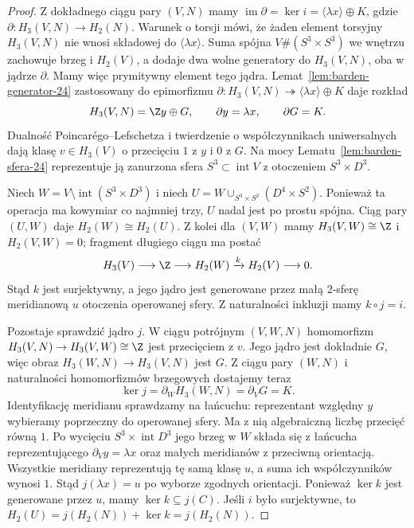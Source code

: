 \begin{proof}
Z dokładnego ciągu pary $(V,N)$ mamy
$\operatorname{im}\partial=\ker i
=\langle\lambda x\rangle\oplus K$,
gdzie $\partial\colon H_3(V,N)\to H_2(N)$.
Warunek o torsji mówi, że żaden element
torsyjny $H_3(V,N)$ nie wnosi składowej
do $\langle\lambda x\rangle$.
Suma spójna $V\#(S^3\times S^3)$
we wnętrzu zachowuje brzeg i $H_2(V)$,
a dodaje dwa wolne generatory do
$H_3(V,N)$, oba w jądrze $\partial$.
Mamy więc prymitywny element tego jądra.
Lemat~\ref{lem:barden-generator-24}
zastosowany do epimorfizmu
$\partial\colon H_3(V,N)\twoheadrightarrow
\langle\lambda x\rangle\oplus K$
daje rozkład
\[
 H_3(V,N)=\Z y\oplus G,
 \qquad \partial y=\lambda x,
 \qquad \partial G=K.
\]
Dualność Poincarégo--Lefschetza i
twierdzenie o współczynnikach
uniwersalnych dają klasę
$v\in H_3(V)$ o przecięciu $1$ z $y$
i $0$ z $G$. Na mocy
Lematu~\ref{lem:barden-sfera-24}
reprezentuje ją zanurzona sfera
$S^3\subset\operatorname{int}V$
z otoczeniem $S^3\times D^3$.

Niech $W=V\setminus\operatorname{int}
(S^3\times D^3)$ i niech
$U=W\cup_{S^3\times S^2}(D^4\times S^2)$.
Ponieważ ta operacja ma kowymiar
co najmniej trzy, $U$ nadal jest
po prostu spójna. Ciąg pary $(U,W)$
daje $H_2(W)\cong H_2(U)$.
Z kolei dla $(V,W)$ mamy
$H_3(V,W)\cong\Z$ i $H_2(V,W)=0$;
fragment długiego ciągu ma postać
\[
 H_3(V)\longrightarrow\Z
 \longrightarrow H_2(W)
 \xrightarrow{k}H_2(V)\longrightarrow0.
\]
Stąd $k$ jest surjektywny, a jego
jądro jest generowane przez małą
$2$-sferę meridianową $u$ otoczenia
operowanej sfery. Z naturalności
inkluzji mamy $k\circ j=i$.

Pozostaje sprawdzić jądro $j$.
W ciągu potrójnym $(V,W,N)$
homomorfizm
$H_3(V,N)\to H_3(V,W)\cong\Z$
jest przecięciem z $v$.
Jego jądro jest dokładnie $G$,
więc obraz $H_3(W,N)\to H_3(V,N)$
jest $G$. Z ciągu pary $(W,N)$
i naturalności homomorfizmów
brzegowych dostajemy teraz
\[
 \ker j=\partial_W H_3(W,N)
       =\partial_V G=K.
\]
Identyfikację meridianu sprawdzamy
na łańcuchu: reprezentant względny
$y$ wybieramy poprzeczny do operowanej
sfery. Ma z nią algebraiczną liczbę
przecięć równą $1$. Po wycięciu
$S^3\times\operatorname{int}D^3$
jego brzeg w $W$ składa się z
łańcucha reprezentującego
$\partial_Vy=\lambda x$ oraz
małych meridianów z przeciwną
orientacją. Wszystkie meridiany
reprezentują tę samą klasę $u$,
a suma ich współczynników wynosi $1$.
Stąd $j(\lambda x)=u$ po wyborze
zgodnych orientacji.
Ponieważ $\ker k$ jest generowane
przez $u$, mamy $\ker k\subseteq j(C)$.
Jeśli $i$ było surjektywne, to
$H_2(U)=j(H_2(N))+\ker k=j(H_2(N))$.
\end{proof}

